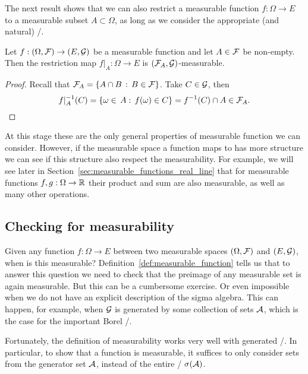 The next result shows that we can also restrict a measurable function $f : \Omega \to E$ to a measurable subset $A \subset \Omega$, as long as we consider the appropriate (and natural) \sigalg/.

\begin{lemma}
Let $f: (\Omega, \mathcal F) \to (E, \mathcal G)$ be a measurable function and let $A \in \mathcal F$ be non-empty. Then the restriction map $f|_A : \Omega \to E$ is $(\mathcal F_A, \mathcal G)$-measurable.
\end{lemma}

\begin{proof}
Recall that $\mathcal F_A = \{A \cap B \, : \, B \in \mathcal F\}$. Take $C \in \mathcal G$, then
\[
	f|_A^{-1}(C) = \{\omega \in \, A : \, f(\omega) \in C\} = f^{-1}(C) \cap A \in \mathcal F_A.\qedhere
\]
\end{proof}

At this stage these are the only general properties of measurable function we can consider. However, if the measurable space a function maps to has more structure we can see if this structure also respect the measurability. For example, we will see later in Section~\ref{sec:measurable_functions_real_line} that for measurable functions $f, g : \Omega \to \mathbb R$ their product and sum are also measurable, as well as many other operations.

\subsection{Checking for measurability}

Given any function $f : \Omega \to E$ between two measurable spaces $(\Omega, \mathcal F)$ and $(E, \mathcal G)$, when is this measurable? Definition~\ref{def:measurable_function} tells us that to answer this question we need to check that the preimage of any measurable set is again measurable. But this can be a cumbersome exercise. Or even impossible when we do not have an explicit description of the sigma algebra. This can happen, for example, when $\mathcal G$ is generated by some collection of sets $\mathcal A$, which is the case for the important Borel \sigalg/. 

Fortunately, the definition of measurability works very well with generated \sigalgs/. In particular, to show that a function is measurable, it suffices to only consider sets from the generator set $\mathcal A$, instead of the entire \sigalg/ $\sigma(\mathcal A)$.

